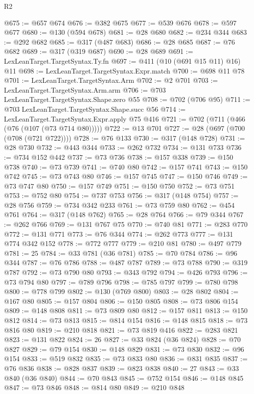 \begin{lexlean}{R2}
\begin{coremodule}
@675 := @657 @674
@676 := @382 @675
@677 := @539 @676
@678 := @597 @677
@680 := @130 (@594 @678)
@681 := @28 @680
@682 := @234 @344
@683 := @292 @682
@685 := @317 (@487 @683)
@686 := @28 @685
@687 := @76 @682
@689 := @317 (@319 @687)
@690 := @28 @689
@691 := LexLeanTarget.TargetSyntax.Ty.fn
@697 := @411 (@10 (@691 @15 @11) @16) @11
@698 := LexLeanTarget.TargetSyntax.Expr.match
@700 := @698 @11 @78
@701 := LexLeanTarget.TargetSyntax.Arm
@702 := @2 @701
@703 := LexLeanTarget.TargetSyntax.Arm.arm
@706 := @703 LexLeanTarget.TargetSyntax.Shape.zero @55
@708 := @702 (@706 @95)
@711 := @703 LexLeanTarget.TargetSyntax.Shape.succ @56
@714 := LexLeanTarget.TargetSyntax.Expr.apply @75 @416
@721 := @702 (@711 (@466 (@76 (@107 (@73 @714 @80)))))
@722 := @13 @701
@727 := @28 (@697 (@700 (@708 (@721 @722))))
@728 := @76 @133
@730 := @317 (@148 @728)
@731 := @28 @730
@732 := @443 @344
@733 := @262 @732
@734 := @131 @733
@736 := @734 @152 @442
@737 := @73 @736
@738 := @157 @338
@739 := @150 @738
@740 := @73 @739
@741 := @740 @80
@742 := @157 @741
@743 := @150 @742
@745 := @73 @743 @80
@746 := @157 @745
@747 := @150 @746
@749 := @73 @747 @80
@750 := @157 @749
@751 := @150 @750
@752 := @73 @751
@753 := @752 @80
@754 := @737 @753
@756 := @317 (@148 @754)
@757 := @28 @756
@759 := @734 @342 @233
@761 := @73 @759 @80
@762 := @454 @761
@764 := @317 (@148 @762)
@765 := @28 @764
@766 := @79 @344
@767 := @262 @766
@769 := @131 @767 @75
@770 := @740 @81
@771 := @283 @770
@772 := @131 @771
@773 := @76 @344
@774 := @262 @773
@777 := @131 @774 @342 @152
@778 := @772 @777
@779 := @210 @81
@780 := @497 @779
@781 := 25
@784 := @33 @781 (@36 @781)
@785 := @70 @784
@786 := @96 @344
@787 := @76 @786
@788 := @487 @787
@789 := @73 @788
@790 := @319 @787
@792 := @73 @790 @80
@793 := @343 @792
@794 := @426 @793
@796 := @73 @794 @80
@797 := @789 @796
@798 := @785 @797
@799 := @780 @798
@800 := @778 @799
@802 := @130 (@769 @800)
@803 := @28 @802
@804 := @167 @80
@805 := @157 @804
@806 := @150 @805
@808 := @73 @806 @154
@809 := @148 @808
@811 := @73 @809 @80
@812 := @157 @811
@813 := @150 @812
@814 := @73 @813
@815 := @814 @154
@816 := @148 @815
@818 := @73 @816 @80
@819 := @210 @818
@821 := @73 @819 @416
@822 := @283 @821
@823 := @131 @822
@824 := 26
@827 := @33 @824 (@36 @824)
@828 := @70 @827
@829 := @79 @154
@830 := @148 @829
@831 := @73 @830
@832 := @96 @154
@833 := @519 @832
@835 := @73 @833 @80
@836 := @831 @835
@837 := @76 @836
@838 := @828 @837
@839 := @823 @838
@840 := 27
@843 := @33 @840 (@36 @840)
@844 := @70 @843
@845 := @752 @154
@846 := @148 @845
@847 := @73 @846
@848 := @814 @80
@849 := @210 @848

\end{coremodule}
\end{lexlean}

